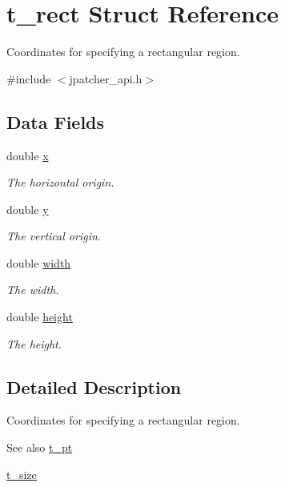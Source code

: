 \hypertarget{structt__rect}{
\section{t\_\-rect Struct Reference}
\label{structt__rect}
}


Coordinates for specifying a rectangular region.  


{\ttfamily \#include $<$jpatcher\_\-api.h$>$}\subsection*{Data Fields}
\begin{DoxyCompactItemize}
\item 
\hypertarget{structt__rect_a00bdba29ffed1459c10dd6e988e5579c}{
double \hyperlink{structt__rect_a00bdba29ffed1459c10dd6e988e5579c}{x}}
\label{structt__rect_a00bdba29ffed1459c10dd6e988e5579c}

\begin{DoxyCompactList}\small\item\em The horizontal origin. \item\end{DoxyCompactList}\item 
\hypertarget{structt__rect_aa6c75c93ad7a0cb4ff0834f6e0b2a723}{
double \hyperlink{structt__rect_aa6c75c93ad7a0cb4ff0834f6e0b2a723}{y}}
\label{structt__rect_aa6c75c93ad7a0cb4ff0834f6e0b2a723}

\begin{DoxyCompactList}\small\item\em The vertical origin. \item\end{DoxyCompactList}\item 
\hypertarget{structt__rect_ab847deccce398dc299128046647413d9}{
double \hyperlink{structt__rect_ab847deccce398dc299128046647413d9}{width}}
\label{structt__rect_ab847deccce398dc299128046647413d9}

\begin{DoxyCompactList}\small\item\em The width. \item\end{DoxyCompactList}\item 
\hypertarget{structt__rect_aca22f5c74590cfbbc24c75dd432e5f75}{
double \hyperlink{structt__rect_aca22f5c74590cfbbc24c75dd432e5f75}{height}}
\label{structt__rect_aca22f5c74590cfbbc24c75dd432e5f75}

\begin{DoxyCompactList}\small\item\em The height. \item\end{DoxyCompactList}\end{DoxyCompactItemize}


\subsection{Detailed Description}
Coordinates for specifying a rectangular region. \begin{DoxySeeAlso}{See also}
\hyperlink{structt__pt}{t\_\-pt} 

\hyperlink{structt__size}{t\_\-size} 
\end{DoxySeeAlso}
